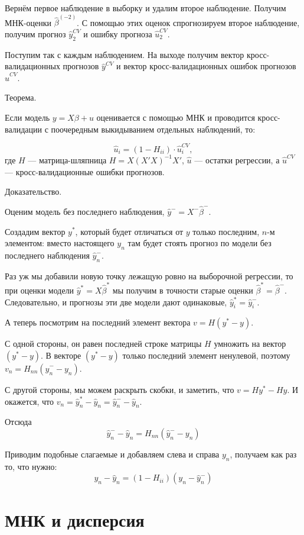 \documentclass[11pt,russian,]{book}
\begin{document}
Вернём первое наблюдение в выборку и удалим второе наблюдение. Получим МНК-оценки \(\hat\beta^{(-2)}\).
С помощью этих оценок спрогнозируем второе наблюдение, получим прогноз \(\hat y_2^{CV}\) и ошибку прогноза \(\hat u_2^{CV}\).

Поступим так с каждым наблюдением. На выходе получим вектор кросс-валидационных прогнозов \(\hat y^{CV}\) и вектор кросс-валидационных ошибок прогнозов \(\hat u^{CV}\).

Теорема.

Если модель \(y=X\beta + u\) оценивается с помощью МНК и проводится кросс-валидации с поочередным выкидыванием отдельных наблюдений, то:

\[
\hat u_i = (1 - H_{ii}) \cdot \hat u_i^{CV},
\]
где \(H\) --- матрица-шляпница \(H = X(X'X)^{-1}X'\), \(\hat u\) --- остатки регрессии, а \(\hat u^{CV}\) --- кросс-валидационные ошибки прогнозов.

Доказательство.

Оценим модель без последнего наблюдения, \(\hat y^{-} = X^{-} \hat\beta^{-}\).

Создадим вектор \(y^{*}\), который будет отличаться от \(y\) только последним, \(n\)-м элементом:
вместо настоящего \(y_n\) там будет стоять прогноз по модели без последнего наблюдения \(\hat y^{-}_n\).

Раз уж мы добавили новую точку лежащую ровно на выборочной регрессии, то при оценки модели
\(\hat y^* = X \hat \beta^*\) мы получим в точности старые оценки \(\hat \beta^* = \hat \beta^-\).
Следовательно, и прогнозы эти две модели дают одинаковые, \(\hat y_i^* = \hat y_i^-\).

А теперь посмотрим на последний элемент вектора \(v = H (y^* - y)\).

С одной стороны, он равен последней строке матрицы \(H\) умножить на вектор \((y^* - y)\).
В векторе \((y^* - y)\) только последний элемент ненулевой, поэтому \(v_n = H_{nn} (\hat y^{-}_n - y_n)\).

С другой стороны, мы можем раскрыть скобки, и заметить, что \(v = Hy^* - Hy\).
И окажется, что \(v_n = \hat y_n^* - \hat y_n = \hat y_n^- - \hat y_n\).

Отсюда
\[
 \hat y_n^- - \hat y_n = H_{nn} (\hat y_n^- - y_n)
\]

Приводим подобные слагаемые и добавляем слева и справа \(y_n\), получаем как раз то, что нужно:
\[
y_n - \hat y_n   = (1 - H_{ii}) (y_n - \hat y_n^- )
\]

\hypertarget{ols_variance}{%
\chapter{МНК и дисперсия}\label{ols_variance}}
\end{document}
